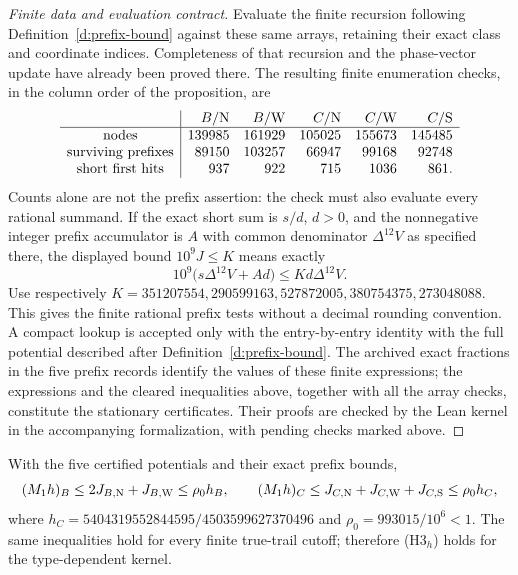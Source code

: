 \begin{proof}[Finite data and evaluation contract]
Evaluate the finite recursion following
Definition~\ref{d:prefix-bound} against these same arrays, retaining
their exact class and coordinate indices. Completeness of that
recursion and the phase-vector update have already been proved
there. The resulting finite enumeration checks, in the column
order of the proposition, are
\[
 \begin{array}{c|rrrrr}
 &B/{\rm N}&B/{\rm W}&C/{\rm N}&C/{\rm W}&C/{\rm S}\\ \hline
 \text{nodes}&139985&161929&105025&155673&145485\\
 \text{surviving prefixes}&89150&103257&66947&99168&92748\\
 \text{short first hits}&937&922&715&1036&861.
 \end{array}
\]
Counts alone are not the prefix assertion: the check must also
evaluate every rational summand. If the exact short sum is
\(s/d\), \(d>0\), and the nonnegative integer prefix accumulator
is \(A\) with common denominator \(\Delta^{12}V\) as specified
there, the displayed bound \(10^9J\le K\) means exactly
\[
 10^9\bigl(s\Delta^{12}V+Ad\bigr)
                  \le Kd\Delta^{12}V .
\]
Use respectively
\(K=351207554,290599163,527872005,380754375,273048088\).
This gives the finite rational prefix tests without a decimal
rounding convention. 
A compact lookup is accepted only with the
entry-by-entry identity with the full potential described after
Definition~\ref{d:prefix-bound}.
The archived exact fractions in the five prefix records identify
the values of these finite expressions; the expressions and the
cleared inequalities above, together with all the array checks,
constitute the stationary certificates. Their proofs are checked by
the Lean kernel in the accompanying formalization, with pending
checks marked above.
\end{proof}

\begin{lemma}\label{l:stationary-assembly}
With the five certified potentials and their exact prefix bounds,
\[
 (M_1h)_B\le2J_{B,{\rm N}}+J_{B,{\rm W}}\le\rho_0h_B,\qquad
 (M_1h)_C\le J_{C,{\rm N}}+J_{C,{\rm W}}+J_{C,{\rm S}}
                                      \le\rho_0h_C ,
\]
where \(h_C=5404319552844595/4503599627370496\) and
\(\rho_0=993015/10^6<1\).
The same inequalities hold for every finite true-trail cutoff;
therefore (H3\(_h\)) holds for the type-dependent kernel.
\end{lemma}

